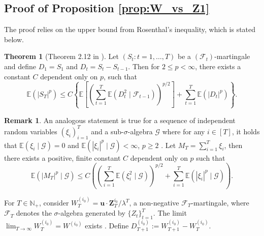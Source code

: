 \documentclass[preprint,3p,12pt]{elsarticle}
\theoremstyle{definition}
\newtheorem*{remark}{Remark}
\newtheorem{theorem}{Theorem}
\begin{document}

\subsection{Proof of Proposition \ref{prop:W_vs_Z1}}\label{W_vs_Z1}

The proof relies on the upper bound from Rosenthal's inequality, which is stated below. 
\begin{theorem}[Theorem 2.12 in \cite{hall}]
Let $(S_t: t=1,\dots,T)$ be a $(\mathcal{F}_t)$-martingale and define $D_1 = S_1$ and $D_{t} = S_t - S_{t-1}$. Then for $2 \le p < \infty$, there exists a constant $C$ dependent only on $p$, such that 
    \begin{equation}
        \mathbb{E}(\lvert S_T\rvert^p)
\le C \left\{
\mathbb{E}\left[\left(\sum_{t=1}^T \mathbb{E}\!\left(D_t^2 \mid \mathcal{F}_{t-1}\right)\right)^{p/2}\right]
+ \sum_{t=1}^T \mathbb{E} (\lvert D_t\rvert^p)
\right\}. \label{eq:martingale_rosenthal}
    \end{equation}
\end{theorem}

\begin{remark}
An analogous statement is true for a sequence of independent random variables $(\xi_i)_{i=1}^T$ and a sub-$\sigma$-algebra $\mathcal{G}$ where for any $i \in [T]$, it holds that $\mathbb{E}(\xi_i \mid \mathcal{G}) = 0$ and $\mathbb{E}(|\xi_i|^p \mid \mathcal{G}) < \infty$, $p \ge 2$ \cite{rosenthal}. Let $M_T = \sum_{i=1}^T \xi_i$, then there exists a positive, finite constant $C$  dependent only on $p$ such that
\begin{equation}
    \mathbb{E}(|M_T|^p\mid \mathcal{G}) \le C \left(  \left(\sum_{i=1}^T \mathbb{E}(\xi_i^2 \mid \mathcal{G})\right)^{p/2}  + \sum_{i=1}^T \mathbb{E}(|\xi_i|^p \mid \mathcal{G})\right). \label{eq:iid_rosenthal}
\end{equation}

\end{remark}

For $T \in \mathbb{N}_+$, consider $W_T^{(i_0)} = \boldsymbol{u} \cdot \boldsymbol{Z}_T^{i_0}/\lambda^T$, a non-negative $\mathcal{F}_T$-martingale, where $\mathcal{F}_T$ denotes the $\sigma$-algebra generated by $\{Z_t\}_{t=1}^T$. The limit $\lim_{T \rightarrow \infty}{W_T^{(i_0)}} = W^{(i_0)}$ exists \cite[Theorem 4, Chapter V]{athreya_ney}. Define $D_{T+1}^{(i_0)} := W_{T+1}^{(i_0)} - W_T^{(i_0)}$.
\end{document}
